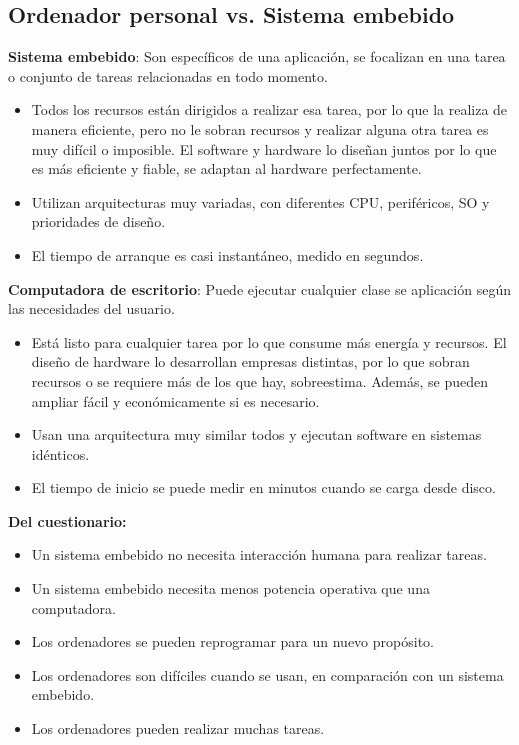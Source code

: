 \documentclass[12pt, twoside, openright]{report} %
\begin{document}
\subsection{Ordenador personal vs. Sistema
	embebido}

\textbf{Sistema embebido}: Son específicos de una aplicación, se
focalizan en una tarea o conjunto de tareas relacionadas en todo
momento.

\begin{itemize}
	\item Todos los recursos están dirigidos a realizar esa tarea, por lo que la
	      realiza de manera eficiente, pero no le sobran recursos y realizar alguna otra tarea es
	      muy difícil o imposible. El software y hardware lo diseñan juntos por
	      lo que es más eficiente y fiable, se adaptan al hardware
	      perfectamente.
	\item Utilizan arquitecturas muy variadas, con diferentes CPU, periféricos,
	      SO y prioridades de diseño.
	\item El tiempo de arranque es casi instantáneo, medido en segundos.
\end{itemize}

\textbf{Computadora de escritorio}: Puede ejecutar cualquier clase se
aplicación según las necesidades del usuario.

\begin{itemize}
	\item Está listo para cualquier tarea por lo que consume más energía y
	      recursos. El diseño de hardware lo desarrollan empresas distintas, por
	      lo que sobran recursos o se requiere más de los que hay, sobreestima.
	      Además, se pueden ampliar fácil y económicamente si es necesario.
	\item Usan una arquitectura muy similar todos y ejecutan software en
	      sistemas idénticos.
	\item El tiempo de inicio se puede medir en minutos cuando se carga desde
	      disco.
\end{itemize}

\textbf{Del cuestionario:}

\begin{itemize}
	\item Un sistema embebido no necesita interacción humana para realizar
	      tareas.
	\item Un sistema embebido necesita menos potencia operativa que una
	      computadora.
	\item Los ordenadores se pueden reprogramar para un nuevo propósito.
	\item Los ordenadores son difíciles cuando se usan, en comparación con un
	      sistema embebido.
	\item Los ordenadores pueden realizar muchas tareas.
\end{itemize}
\end{document}
